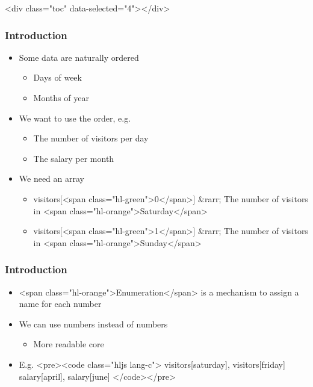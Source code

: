 \documentclass{../c-lecture}
\begin{document}
\begin{frame}
  <div class="toc" data-selected="4"></div>
\end{frame}
\begin{frame}
  \frametitle{Introduction}
  \begin{itemize}
    \item Some data are naturally ordered
    \begin{itemize}
      \item Days of week
      \item Months of year
    \end{itemize}
    \item We want to use the order, e.g.
    \begin{itemize}
      \item The number of visitors per day
      \item The salary per month
    \end{itemize}
    \item We need an array
    \begin{itemize}
      \item
        visitors[<span class="hl-green">0</span>] &rarr; The number of visitors
        in <span class="hl-orange">Saturday</span>

      \item
        visitors[<span class="hl-green">1</span>] &rarr; The number of visitors
        in <span class="hl-orange">Sunday</span>

    \end{itemize}
  \end{itemize}
\end{frame}
\begin{frame}
  \frametitle{Introduction}
  \begin{itemize}
    \item
      <span class="hl-orange">Enumeration</span> is a mechanism to assign a name
      for each number

    \item We can use numbers instead of numbers
    \begin{itemize}
      \item More readable core
    \end{itemize}
    \item E.g.
    <pre><code class="hljs lang-c">
visitors[saturday], visitors[friday]
salary[april], salary[june]
    </code></pre>
  \end{itemize}
\end{frame}
\end{document}

